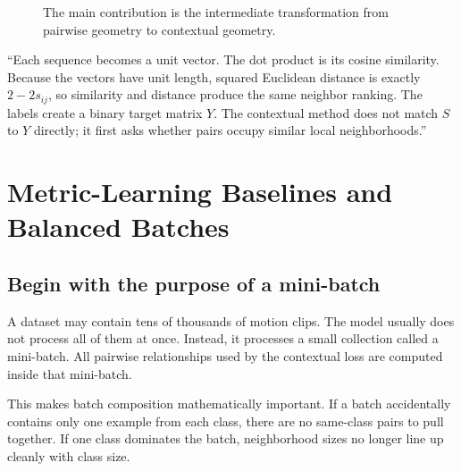 \documentclass[11pt,oneside,openany]{book}
\theoremstyle{myplain}
\theoremstyle{definition}
\begin{document}
\begin{figure}[H]
\centering
{}
\caption{The main contribution is the intermediate transformation from pairwise geometry to contextual geometry.}
\end{figure}

\begin{meetingbox}[title=What to say in the discussion]
``Each sequence becomes a unit vector. The dot product is its cosine similarity. Because the vectors have unit length, squared Euclidean distance is exactly $2-2s_{ij}$, so similarity and distance produce the same neighbor ranking. The labels create a binary target matrix $Y$. The contextual method does not match $S$ to $Y$ directly; it first asks whether pairs occupy similar local neighborhoods.''
\end{meetingbox}


\chapter{Metric-Learning Baselines and Balanced Batches}
\label{chap:baselines}

\section{Begin with the purpose of a mini-batch}

A dataset may contain tens of thousands of motion clips. The model usually does not process all of them at once. Instead, it processes a small collection called a mini-batch. All pairwise relationships used by the contextual loss are computed inside that mini-batch.

This makes batch composition mathematically important. If a batch accidentally contains only one example from each class, there are no same-class pairs to pull together. If one class dominates the batch, neighborhood sizes no longer line up cleanly with class size.
\end{document}
